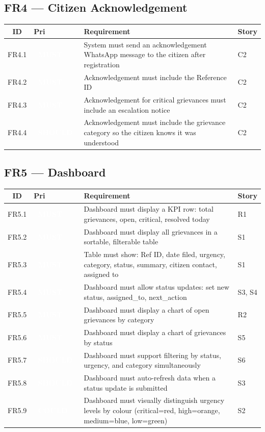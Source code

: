 \documentclass[11pt, a4paper]{article}
\newcommand{\must}{\textcolor{white}{\colorbox{mustcol}{\textbf{\ MUST\ }}}}
\newcommand{\should}{\textcolor{white}{\colorbox{shouldcol}{\textbf{\ SHOULD\ }}}}
\newcommand{\could}{\textcolor{white}{\colorbox{couldcol}{\textbf{\ COULD\ }}}}
\begin{document}
\subsection{FR4 --- Citizen Acknowledgement}

\begin{tabularx}{\linewidth}{clXl}
\toprule
\textbf{ID} & \textbf{Pri} & \textbf{Requirement} & \textbf{Story} \\
\midrule
FR4.1 & \must   & System must send an acknowledgement WhatsApp message to the citizen after registration & C2 \\
FR4.2 & \must   & Acknowledgement must include the Reference ID & C2 \\
FR4.3 & \must   & Acknowledgement for critical grievances must include an escalation notice & C2 \\
FR4.4 & \should & Acknowledgement must include the grievance category so the citizen knows it was understood & C2 \\
\bottomrule
\end{tabularx}

\subsection{FR5 --- Dashboard}

\begin{tabularx}{\linewidth}{clXl}
\toprule
\textbf{ID} & \textbf{Pri} & \textbf{Requirement} & \textbf{Story} \\
\midrule
FR5.1  & \must   & Dashboard must display a KPI row: total grievances, open, critical, resolved today & R1 \\
FR5.2  & \must   & Dashboard must display all grievances in a sortable, filterable table & S1 \\
FR5.3  & \must   & Table must show: Ref ID, date filed, urgency, category, status, summary, citizen contact, assigned to & S1 \\
FR5.4  & \must   & Dashboard must allow status updates: set new status, assigned\_to, next\_action & S3, S4 \\
FR5.5  & \must   & Dashboard must display a chart of open grievances by category & R2 \\
FR5.6  & \must   & Dashboard must display a chart of grievances by status & S5 \\
FR5.7  & \should & Dashboard must support filtering by status, urgency, and category simultaneously & S6 \\
FR5.8  & \should & Dashboard must auto-refresh data when a status update is submitted & S3 \\
FR5.9  & \could  & Dashboard must visually distinguish urgency levels by colour (critical=red, high=orange, medium=blue, low=green) & S2 \\
\bottomrule
\end{tabularx}
\end{document}
